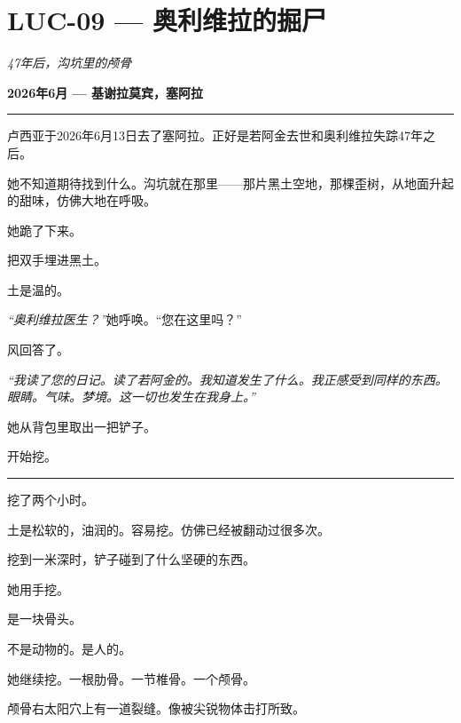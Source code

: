 \section*{\textbf{LUC-09} --- 奥利维拉的掘尸}

\noindent \textit{47年后，沟坑里的颅骨}

\noindent \textbf{2026年6月 --- 基谢拉莫宾，塞阿拉}

\vspace{0.5em}\noindent\rule{\textwidth}{0.5pt}\vspace{0.5em}

\noindent 卢西亚于2026年6月13日去了塞阿拉。正好是若阿金去世和奥利维拉失踪47年之后。

\noindent 她不知道期待找到什么。沟坑就在那里——那片黑土空地，那棵歪树，从地面升起的甜味，仿佛大地在呼吸。

\noindent 她跪了下来。

\noindent 把双手埋进黑土。

\noindent 土是温的。

\noindent \textit{\textquotedblleft{}奥利维拉医生？\textquotedblright{}}她呼唤。\textquotedblleft{}您在这里吗？\textquotedblright{}

\noindent 风回答了。

\noindent \textit{\textquotedblleft{}我读了您的日记。读了若阿金的。我知道发生了什么。我正感受到同样的东西。眼睛。气味。梦境。这一切也发生在我身上。\textquotedblright{}}

\noindent 她从背包里取出一把铲子。

\noindent 开始挖。

\vspace{0.5em}\noindent\rule{\textwidth}{0.5pt}\vspace{0.5em}

\noindent 挖了两个小时。

\noindent 土是松软的，油润的。容易挖。仿佛已经被翻动过很多次。

\noindent 挖到一米深时，铲子碰到了什么坚硬的东西。

\noindent 她用手挖。

\noindent 是一块骨头。

\noindent 不是动物的。是人的。

\noindent 她继续挖。一根肋骨。一节椎骨。一个颅骨。

\noindent 颅骨右太阳穴上有一道裂缝。像被尖锐物体击打所致。

